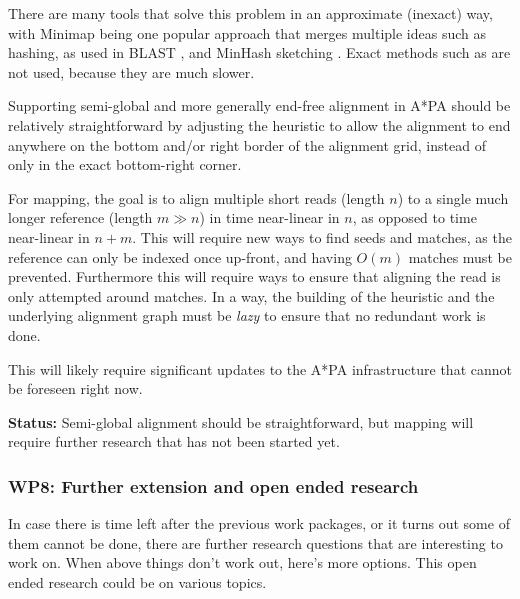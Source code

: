 \documentclass[11pt,english,a4paper]{article}
\begin{document}
There are many tools that solve this problem in an approximate (inexact) way, with
Minimap \autocite{minimap,minimap2} being one popular approach that merges
multiple ideas such as hashing, as used in BLAST \autocite{blast}, and MinHash
sketching \autocite{minhash}. Exact methods such as \textcite{lv89} are not used,
because they are much slower.

Supporting semi-global and more generally end-free alignment in A*PA should be
relatively straightforward by adjusting the heuristic to allow the alignment to
end anywhere on the bottom and/or right border of the alignment grid, instead of
only in the exact bottom-right corner.

For mapping, the goal is to align multiple short reads (length \(n\)) to a single
much longer reference (length \(m\gg n\)) in time near-linear in \(n\), as opposed
to time near-linear in \(n+m\).  This will require new ways to find seeds and
matches, as the reference can only be indexed once up-front, and having \(O(m)\)
matches must be prevented. Furthermore this will require ways to ensure that
aligning the read is only attempted around matches. In a way, the building of
the heuristic and the underlying alignment graph must be \emph{lazy} to ensure that
no redundant work is done.

This will likely require significant updates to the A*PA infrastructure that
cannot be foreseen right now.

\textbf{Status:} Semi-global alignment should be straightforward, but mapping will
require further research that has not been started yet.

\subsubsection{WP8: Further extension and open ended research}
\label{sec:orgdd71a7a}
In case there is time left after the previous work packages, or it turns out
some of them cannot be done, there are further research questions that are
interesting to work on.
When above things don't work out, here's more options.
This open ended research could be on various topics.
\end{document}
